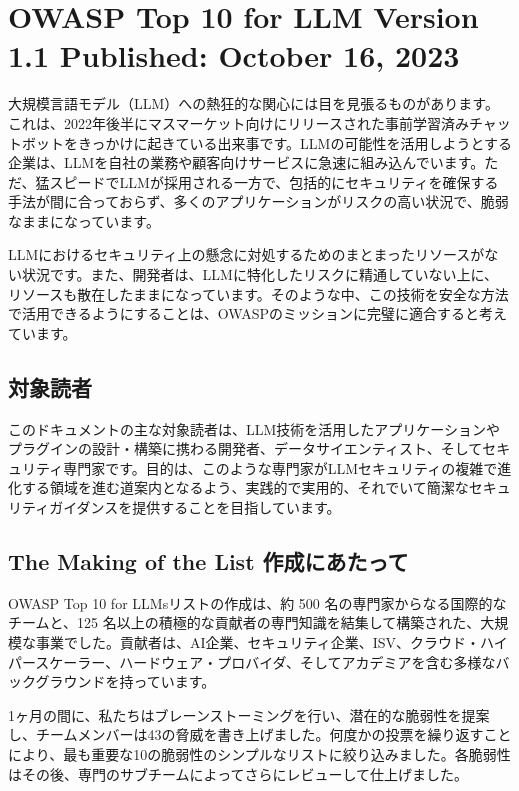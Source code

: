 \documentclass[
]{article}
\author{}
\date{}
\begin{document}
\section{OWASP Top 10 for LLM Version 1.1 Published: October 16,
2023}\label{owasp-top-10-for-llm-version-1.1-published-october-16-2023}

大規模言語モデル（LLM）への熱狂的な関心には目を見張るものがあります。これは、2022年後半にマスマーケット向けにリリースされた事前学習済みチャットボットをきっかけに起きている出来事です。LLMの可能性を活用しようとする企業は、LLMを自社の業務や顧客向けサービスに急速に組み込んでいます。ただ、猛スピードでLLMが採用される一方で、包括的にセキュリティを確保する手法が間に合っておらず、多くのアプリケーションがリスクの高い状況で、脆弱なままになっています。

LLMにおけるセキュリティ上の懸念に対処するためのまとまったリソースがない状況です。また、開発者は、LLMに特化したリスクに精通していない上に、リソースも散在したままになっています。そのような中、この技術を安全な方法で活用できるようにすることは、OWASPのミッションに完璧に適合すると考えています。

\subsection{対象読者}\label{ux5bfeux8c61ux8aadux8005}

このドキュメントの主な対象読者は、LLM技術を活用したアプリケーションやプラグインの設計・構築に携わる開発者、データサイエンティスト、そしてセキュリティ専門家です。目的は、このような専門家がLLMセキュリティの複雑で進化する領域を進む道案内となるよう、実践的で実用的、それでいて簡潔なセキュリティガイダンスを提供することを目指しています。

\subsection{The Making of the List
作成にあたって}\label{the-making-of-the-list-ux4f5cux6210ux306bux3042ux305fux3063ux3066}

OWASP Top 10 for LLMsリストの作成は、約 500
名の専門家からなる国際的なチームと、125
名以上の積極的な貢献者の専門知識を結集して構築された、大規模な事業でした。貢献者は、AI企業、セキュリティ企業、ISV、クラウド・ハイパースケーラー、ハードウェア・プロバイダ、そしてアカデミアを含む多様なバックグラウンドを持っています。

1ヶ月の間に、私たちはブレーンストーミングを行い、潜在的な脆弱性を提案し、チームメンバーは43の脅威を書き上げました。何度かの投票を繰り返すことにより、最も重要な10の脆弱性のシンプルなリストに絞り込みました。各脆弱性はその後、専門のサブチームによってさらにレビューして仕上げました。
\end{document}
